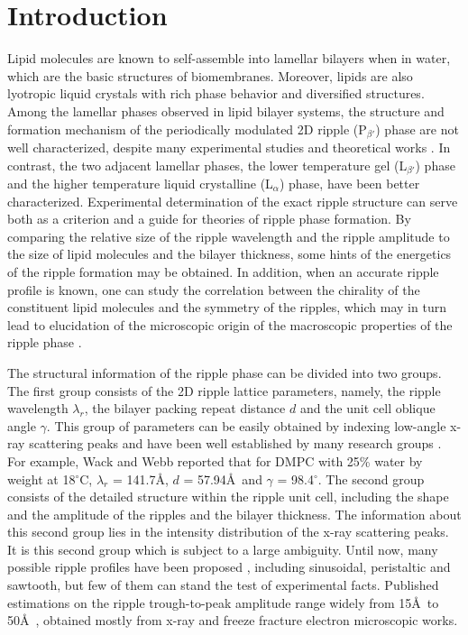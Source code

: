 \section{Introduction}

Lipid molecules are known to self-assemble into lamellar bilayers when in
water, which are the basic structures of biomembranes. Moreover,
lipids are also lyotropic liquid crystals with rich phase behavior
and diversified structures. Among the lamellar phases observed in
lipid bilayer systems, the structure and formation mechanism of the 
periodically modulated 2D ripple (P$_{\beta '}$) phase are not well
characterized, despite many experimental studies 
\cite{Tar73,JanSS76,JanSS79,Luna77,Ino78,%
Ino80,Cop80,Sta82,Rup83,HenHos83,Ale85,Hic87,Zas87,Zas88b,Sir88,Morten88,%
Wac89a,HenRus91,Cev91,Wol92,Matu90,Kat95} and theoretical works
\cite{Don79,Mar84,Haw86,Car87,Gol88,McCu90,Hon91,Lub93}. 
In contrast, the two adjacent lamellar phases,
the lower temperature gel (L$_{\beta '}$) phase and the higher temperature 
liquid crystalline (L$_{\alpha}$) phase, have been better characterized.
Experimental determination of the exact ripple structure can serve both as a
criterion and a guide for theories of ripple phase formation. By comparing
the relative size of the ripple wavelength and the ripple amplitude to the 
size of lipid molecules and the bilayer thickness, some hints of the 
energetics of the ripple formation \cite{Gol88} may be obtained. In addition, 
when an accurate ripple profile is known, one can study the correlation 
between the chirality of the constituent lipid molecules and the symmetry of 
the ripples, which may in turn lead to elucidation of the microscopic origin 
of the macroscopic properties of the ripple phase \cite{Kat95,Lub93}.

The structural information of the ripple phase can be divided into two
groups. The first group consists of the 2D ripple lattice parameters, namely, 
the ripple wavelength $\lambda_r$, the bilayer packing repeat distance $d$ and
the unit cell oblique angle $\gamma$. This group of parameters can be easily 
obtained by indexing low-angle x-ray scattering peaks and have been well 
established by many research groups \cite{Tar73,JanSS79,Ino80,Ale85,Wac89a}. 
For example, Wack and Webb \cite{Wac89a} reported that for DMPC with
25\% water by weight at 18$^{\circ}$C, $\lambda_r$ = 141.7\AA, $d$ = 57.94\AA\
and $\gamma$ = 98.4$^{\circ}$.  The second group
consists of the detailed structure within the ripple unit cell, including
the shape and the amplitude of the ripples and the bilayer thickness. The
information about this second group lies in the intensity distribution of the 
x-ray scattering peaks. It is this second group which is subject to a large
 ambiguity. Until now, many possible ripple profiles have been 
proposed \cite{Tar73,JanSS79,Sta82,Don79,Mar84,Car87,Gol88,McCu90,Hon91,Lub93},
including sinusoidal, peristaltic and sawtooth, but few of them can stand the 
test of experimental facts. Published estimations on the ripple trough-to-peak 
amplitude range widely from 15\AA\ to 50\AA\ 
\cite{Tar73,JanSS79,Sta82,Zas87,Zas88b,Zas88a,Hata93},
obtained mostly from x-ray and freeze fracture electron microscopic works.

